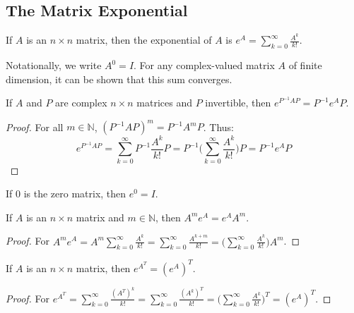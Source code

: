 \documentclass[crop=false,class=book,oneside]{standalone}                      %
\begin{document}
        \subsection{The Matrix Exponential}
        \begin{definition}
        If $A$ is an $n\times n$ matrix, then the exponential of $A$ is $e^{A} =\sum_{k=0}^{\infty} \frac{A^k}{k!}$.
        \end{definition}
        \begin{remark}
        Notationally, we write $A^0 = I$. For any complex-valued matrix $A$ of finite dimension, it can be shown that this sum converges.
        \end{remark}
        \begin{theorem}
        If $A$ and $P$ are complex $n\times n$ matrices and $P$ invertible, then $e^{P^{-1}AP} = P^{-1}e^{A}P$.
        \end{theorem}
        \begin{proof}
        For all $m\in \mathbb{N}$, $(P^{-1}AP)^{m} = P^{-1}A^mP$. Thus:
        \begin{equation*}
            e^{P^{-1}AP} = \sum_{k=0}^{\infty} P^{-1}\frac{A^k}{k!}P = P^{-1}\big(\sum_{k=0}^{\infty} \frac{A^k}{k!}\big)P = P^{-1}e^A P
        \end{equation*}
        \end{proof}
        \begin{theorem}
        If $0$ is the zero matrix, then $e^0 = I$.
        \end{theorem}
        \begin{theorem}
        If $A$ is an $n\times n$ matrix and $m\in \mathbb{N}$, then $A^{m} e^{A} = e^{A} A^{m}$.
        \end{theorem}
        \begin{proof}
        For $A^{m} e^{A} = A^{m} \sum_{k=0}^{\infty} \frac{A^{k}}{k!} = \sum_{k=0}^{\infty} \frac{A^{k+m}}{k!} = \big(\sum_{k=0}^{\infty} \frac{A^k}{k!}\big)A^{m}$.
        \end{proof}
        \begin{theorem}
        If $A$ is an $n\times n$ matrix, then $e^{A^{T}} = (e^{A})^{T}$.
        \end{theorem}
        \begin{proof}
        For $e^{A^{T}} = \sum_{k=0}^{\infty} \frac{(A^{T})^{k}}{k!} = \sum_{k=0}^{\infty} \frac{(A^{k})^{T}}{k!} = \big(\sum_{k=0}^{\infty} \frac{A^{k}}{k!}\big)^{T} = (e^{A})^{T}$.
        \end{proof}
\end{document}
